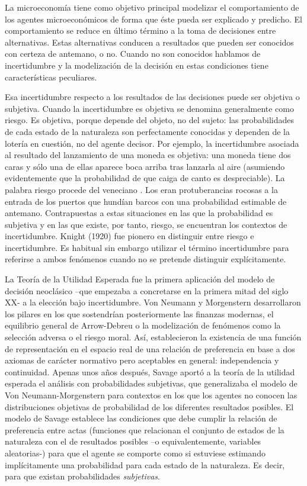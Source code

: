 \documentclass{nuevotema}
\begin{document}
\ideaclave

La microeconomía tiene como objetivo principal modelizar el comportamiento de los agentes microeconómicos de forma que éste pueda ser explicado y predicho. El comportamiento se reduce en último término a la toma de decisiones entre alternativas. Estas alternativas conducen a resultados que pueden ser conocidos con certeza de antemano, o no. Cuando no son conocidos hablamos de incertidumbre y la modelización de la decisión en estas condiciones tiene características peculiares. 

Esa incertidumbre respecto a los resultados de las decisiones puede ser objetiva o subjetiva. Cuando la incertidumbre es objetiva se denomina generalmente como riesgo. Es objetiva, porque depende del objeto, no del sujeto: las probabilidades de cada estado de la naturaleza son perfectamente conocidas y dependen de la lotería en cuestión, no del agente decisor. Por ejemplo, la incertidumbre asociada al resultado del lanzamiento de una moneda es objetiva: una moneda tiene dos caras y sólo una de ellas aparece boca arriba tras lanzarla al aire (asumiendo evidentemente que la probabilidad de que caiga de canto es despreciable). La palabra riesgo procede del veneciano . Los  eran protuberancias rocosas a la entrada de los puertos que hundían barcos con una probabilidad estimable de antemano. Contrapuestas a estas situaciones en las que la probabilidad es subjetiva y en las que existe, por tanto, riesgo, se encuentran los contextos de incertidumbre. Knight (1920) fue pionero en distinguir entre riesgo e incertidumbre. Es habitual sin embargo utilizar el término incertidumbre para referirse a ambos fenómenos cuando no se pretende distinguir explícitamente.

La Teoría de la Utilidad Esperada fue la primera aplicación del modelo de decisión neoclásico --que empezaba a concretarse en la primera mitad del siglo XX- a la elección bajo incertidumbre. Von Neumann y Morgenstern desarrollaron los pilares en los que sostendrían posteriormente las finanzas modernas, el equilibrio general de Arrow-Debreu o la modelización de fenómenos como la selección adversa o el riesgo moral. Así, establecieron la existencia de una función de representación en el espacio real de una relación de preferencia en base a dos axiomas de carácter normativo pero aceptables en general: independencia y continuidad. Apenas unos años después, Savage aportó a la teoría de la utilidad esperada el análisis con probabilidades subjetivas, que generalizaba el modelo de Von Neumann-Morgenstern para contextos en los que los agentes no conocen las distribuciones objetivas de probabilidad de los diferentes resultados posibles. El modelo de Savage establece las condiciones que debe cumplir la relación de preferencia entre actas (funciones que relacionan el conjunto de estados de la naturaleza con el de resultados posibles --o equivalentemente, variables aleatorias-) para que el agente se comporte como si estuviese estimando implícitamente una probabilidad para cada estado de la naturaleza. Es decir, para que existan probabilidades \textit{subjetivas}. 
\end{document}
